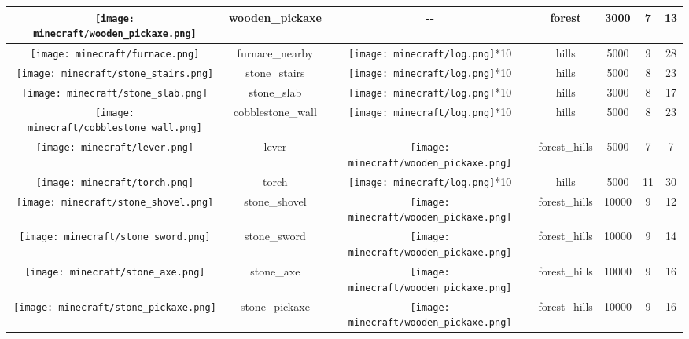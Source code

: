 \documentclass{article}
\newcommand{\mccobblestonewall}{\texttt{[image: minecraft/cobblestone\_wall.png]}}
\newcommand{\mcfurnace}{\texttt{[image: minecraft/furnace.png]}}
\newcommand{\mclever}{\texttt{[image: minecraft/lever.png]}}
\newcommand{\mclog}{\texttt{[image: minecraft/log.png]}}
\newcommand{\mcstonepickaxe}{\texttt{[image: minecraft/stone\_pickaxe.png]}}
\newcommand{\mcstonestairs}{\texttt{[image: minecraft/stone\_stairs.png]}}
\newcommand{\mcstoneslab}{\texttt{[image: minecraft/stone\_slab.png]}}
\newcommand{\mctorch}{\texttt{[image: minecraft/torch.png]}}
\newcommand{\mcwoodenpickaxe}{\texttt{[image: minecraft/wooden\_pickaxe.png]}}
\newcommand{\mcstoneaxe}{\texttt{[image: minecraft/stone\_axe.png]}}
\newcommand{\mcstoneshovel}{\texttt{[image: minecraft/stone\_shovel.png]}}
\newcommand{\mcstonesword}{\texttt{[image: minecraft/stone\_sword.png]}}
\begin{document}
\begin{table}[htbp]
\begin{tabular}{ccccccc}
    \mcwoodenpickaxe  &  wooden\_pickaxe & \--\-- & forest & 3000 & 7 & 13  \\
    \midrule
    \mcfurnace  &  furnace\_nearby & \mclog*10 & hills & 5000 & 9 & 28 \\
    \mcstonestairs  & stone\_stairs  & \mclog*10 & hills & 5000 & 8 & 23 \\
    \mcstoneslab  & stone\_slab  &  \mclog*10 & hills & 3000 & 8 & 17  \\
    \mccobblestonewall  & cobblestone\_wall  & \mclog*10 & hills & 5000 & 8 & 23  \\
    \mclever  &  lever & \mcwoodenpickaxe & forest\_hills & 5000 & 7 & 7 \\
    \mctorch  & torch  & \mclog*10 & hills & 5000 & 11 & 30  \\
    \mcstoneshovel  &  stone\_shovel & \mcwoodenpickaxe & forest\_hills & 10000 & 9 & 12 \\
    \mcstonesword  &  stone\_sword & \mcwoodenpickaxe & forest\_hills & 10000 & 9 & 14 \\
    \mcstoneaxe  &  stone\_axe & \mcwoodenpickaxe & forest\_hills & 10000 & 9 & 16 \\
    \mcstonepickaxe  &  stone\_pickaxe & \mcwoodenpickaxe & forest\_hills & 10000 & 9 & 16 \\
    \bottomrule
  \end{tabular}
\end{table}
\end{document}
